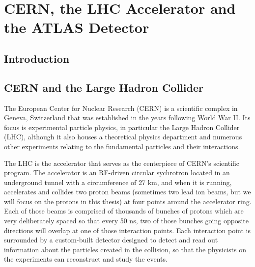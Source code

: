  

\chapter[ATLAS Detector]{CERN, the LHC Accelerator and the ATLAS Detector}




\section{Introduction}

\section{CERN and the Large Hadron Collider}
\label{sec:cern_lhc}
The European Center for Nuclear Research (CERN) is a scientific complex in Geneva, Switzerland that was established in the years following World War II.  Its focus is experimental particle physics, in particular the Large Hadron Collider (LHC), although it also houses a theoretical physics department and numerous other experiments relating to the fundamental particles and their interactions.  

The LHC is the accelerator that serves as the centerpiece of CERN's scientific program.  The accelerator is an RF-driven circular sychrotron located in an underground tunnel with a circumference of 27 km, and when it is running, accelerates and collides two proton beams (sometimes two lead ion beams, but we will focus on the protons in this thesis) at four points around the accelerator ring.  Each of those beams is comprised of thousands of bunches of protons which are very deliberately spaced so that every 50 ns, two of those bunches going opposite directions will overlap at one of those interaction points.  Each interaction point is surrounded by a custom-built detector designed to detect and read out information about the particles created in the collision, so that the physicists on the experiments can reconstruct and study the events.  



